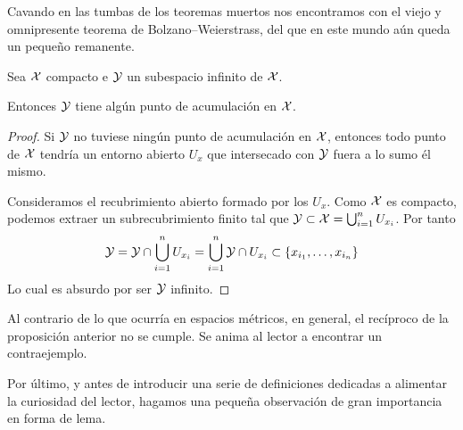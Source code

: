 Cavando en las tumbas de los teoremas muertos nos encontramos con el viejo y omnipresente teorema de Bolzano--Weierstrass, del que en este mundo aún queda un pequeño remanente.

\begin{prop}
		Sea $\mathcal{X}$ compacto e $\mathcal{Y}$ un subespacio infinito de $\mathcal{X}$.
		
		Entonces $\mathcal{Y}$ tiene algún punto de acumulación en $\mathcal{X}$.
\end{prop}
\begin{proof}
	Si $\mathcal{Y}$ no tuviese ningún punto de acumulación en $\mathcal{X}$, entonces todo punto de $\mathcal{X}$ tendría un entorno abierto $U_x$ que intersecado con $\mathcal{Y}$ fuera a lo sumo él mismo.
	
	Consideramos el recubrimiento abierto formado por los $U_x$. Como $\mathcal{X}$ es compacto, podemos extraer un subrecubrimiento finito tal que $\mathcal{Y}\subset \mathcal{X}=\bigcup_{i=1}^nU_{x_i}$. Por tanto \[\mathcal{Y}=\mathcal{Y}\cap\bigcup_{i=1}^nU_{x_i}=\bigcup_{i=1}^n\mathcal{Y}\cap U_{x_i}\subset\{x_{i_1},\dots,x_{i_n}\}\]
	Lo cual es absurdo por ser $\mathcal{Y}$ infinito.
\end{proof}

\begin{obs}[Recíproco]
	Al contrario de lo que ocurría en espacios métricos, en general, el recíproco de la proposición anterior no se cumple. Se anima al lector a encontrar un contraejemplo.
\end{obs}

Por último, y antes de introducir una serie de definiciones dedicadas a alimentar la curiosidad del lector, hagamos una pequeña observación de gran importancia en forma de lema.

